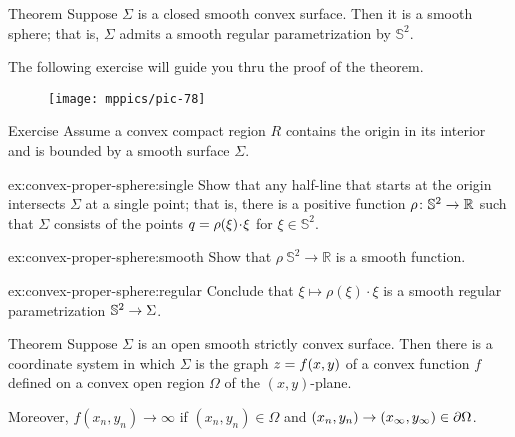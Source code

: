 \begin{thm}{Theorem}\label{thm:convex-closed}
Suppose $\Sigma$ is a closed smooth convex surface.
Then it is a smooth sphere; that is, $\Sigma$ admits a smooth regular parametrization by $\mathbb{S}^2$.\end{thm}

The following exercise will guide you thru the proof of the theorem.

{

\begin{wrapfigure}{r}{33 mm}
\vskip-0mm
\centering
\texttt{[image: mppics/pic-78]}
\end{wrapfigure}

\begin{thm}{Exercise}\label{ex:convex-proper-sphere}
Assume a convex compact region $R$ contains the origin in its interior and is bounded by a smooth surface $\Sigma$.

\begin{subthm}{ex:convex-proper-sphere:single}
Show that any half-line that starts at the origin intersects $\Sigma$ at a single point;
that is, there is a positive function $\rho\:\mathbb{S}^2\z\to\mathbb{R}$ such that $\Sigma$ consists of the points $q\z=\rho(\xi)\cdot \xi$ for $\xi\in \mathbb{S}^2$.
\end{subthm}

\begin{subthm}{ex:convex-proper-sphere:smooth}
Show that $\rho\:\mathbb{S}^2\to\mathbb{R}$ is a smooth function.
\end{subthm}

\begin{subthm}{ex:convex-proper-sphere:regular}
Conclude that $\xi\mapsto \rho(\xi)\cdot \xi$ is a smooth regular parametrization $\mathbb{S}^2\z\to \Sigma$.
\end{subthm}

\end{thm}

\begin{thm}{Theorem}\label{thm:convex-open}
Suppose $\Sigma$ is an open smooth strictly convex surface.
Then there is a coordinate system in which $\Sigma$ is the graph $z\z=f(x,y)$ of a convex function $f$ defined on a convex open region $\Omega$ of the $(x,y)$-plane.

Moreover, $f(x_n,y_n)\to\infty$ if $(x_n,y_n)\in\Omega$ and $(x_n,y_n)\to(x_\infty,y_\infty)\z\in \partial\Omega$.

\end{thm}

}
